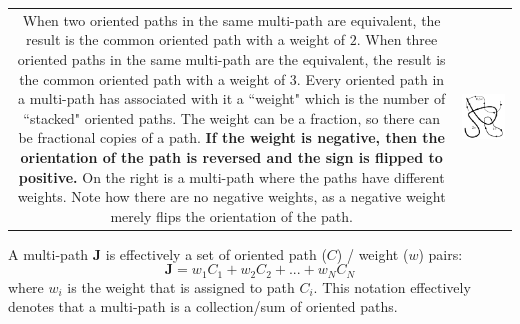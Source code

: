 \documentclass{book}
\begin{document}
\begin{tabular}{cc}
\parbox{0.5\textwidth}{
When two oriented paths in the same multi-path are equivalent, the result is the common oriented path with a weight of \(2\). When three oriented paths in the same multi-path are the equivalent, the result is the common oriented path with a weight of \(3\). Every oriented path in a multi-path has associated with it a ``weight" which is the number of ``stacked" oriented paths. The weight can be a fraction, so there can be fractional copies of a path. {\bf If the weight is negative, then the orientation of the path is reversed and the sign is flipped to positive.} On the right is a multi-path where the paths have different weights. Note how there are no negative weights, as a negative weight merely flips the orientation of the path.  
} & \parbox{0.5\textwidth}{
\includegraphics[scale = 0.75]{Multi-structures/Multipaths/multi-path_multiplicity}
}
\end{tabular}

A multi-path \(\mathbf{J}\) is effectively a set of oriented path (\(C\)) / weight (\(w\)) pairs:
\[\mathbf{J} = w_1 C_1 + w_2 C_2 + ... + w_N C_N\]
where \(w_i\) is the weight that is assigned to path \(C_i\). This notation effectively denotes that a multi-path is a collection/sum of oriented paths.
\end{document}
